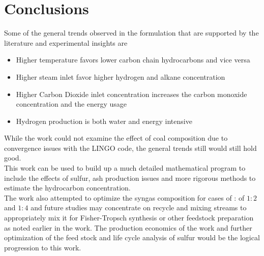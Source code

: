 \documentclass[journal=iecred,manuscript=article]{achemso}
\begin{document}
\section{Conclusions}
Some of the general trends observed in the formulation that are supported by the literature and experimental insights are  

\begin{itemize}
\item Higher temperature favors lower carbon chain hydrocarbons and vice versa
\item Higher steam inlet favor higher hydrogen and alkane concentration
\item Higher Carbon Dioxide inlet concentration increases the carbon monoxide concentration and the energy usage
\item Hydrogen production is both water and energy intensive
\end{itemize} 

While the work could not examine the effect of coal composition due to convergence issues with the LINGO code, the general trends still would still hold good. \\

This work can be used to build up a much detailed mathematical program to include the effects of sulfur, ash production issues and more rigorous methods to estimate the hydrocarbon concentration.\\ 
   
The work also attempted to optimize the syngas composition for cases of : of $1:2$ and $1:4$ and future studies may concentrate on recycle and mixing streams to appropriately mix it for Fisher-Tropsch synthesis or other feedstock preparation as noted earlier in the work. The production economics of the work and further optimization of the feed stock and life cycle analysis of sulfur would be the logical progression to this work. \\ 



     
\end{document}
